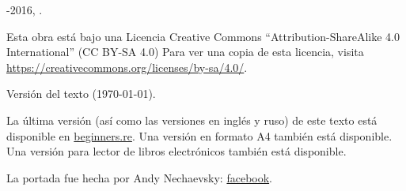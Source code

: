 ﻿\begin{titlepage}


\end{titlepage}

\newpage

\begin{center}
\vspace*{\fill}
{\LARGE \TITLE}

\vspace*{\fill}

{\large \AUTHOR}

{\large \TT{<\EMAIL>}}
\vspace*{\fill}
\vfill

\ccbysa

-2016, \AUTHOR. 

Esta obra est\'a bajo una Licencia Creative Commons ``Attribution-ShareAlike 4.0 International'' (CC BY-SA 4.0)
Para ver una copia de esta licencia, visita \url{https://creativecommons.org/licenses/by-sa/4.0/}.

Versi\'on del texto ({\large \today}).

La \'ultima versi\'on (as\'i como las versiones en ingl\'es y ruso) de este texto est\'a disponible en
\href{http://go.yurichev.com/17009}{beginners.re}.
\ifdefined\ebook
Una versi\'on en formato A4 tambi\'en est\'a disponible.
\else
Una versi\'on para lector de libros electr\'onicos tambi\'en est\'a disponible.
\fi

La portada fue hecha por Andy Nechaevsky: \href{http://go.yurichev.com/17023}{facebook}.

\end{center}

